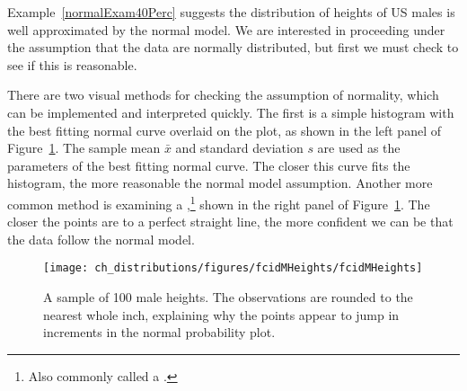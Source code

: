 
Example~\ref{normalExam40Perc} suggests the distribution of heights of US males is well approximated by the normal model. We are interested in proceeding under the assumption that the data are normally distributed, but first we must check to see if this is reasonable.

There are two visual methods for checking the assumption of normality, which can be implemented and interpreted quickly. The first is a simple histogram with the best fitting normal curve overlaid on the plot, as shown in the left panel of Figure~\ref{fcidMHeights}. The sample mean $\bar{x}$ and standard deviation $s$ are used as the parameters of the best fitting normal curve. The closer this curve fits the histogram, the more reasonable the normal model assumption. Another more common method is examining a ,\footnote{Also commonly called a .} shown in the right panel of Figure~\ref{fcidMHeights}. The closer the points are to a perfect straight line, the more confident we can be that the data follow the normal model.

\begin{figure}
\centering
\texttt{[image: ch\_distributions/figures/fcidMHeights/fcidMHeights]}
\caption{A sample of 100 male heights. The observations are rounded to the nearest whole inch, explaining why the points appear to jump in increments in the normal probability plot.}
\label{fcidMHeights}
\end{figure}

\textC{\newpage}

